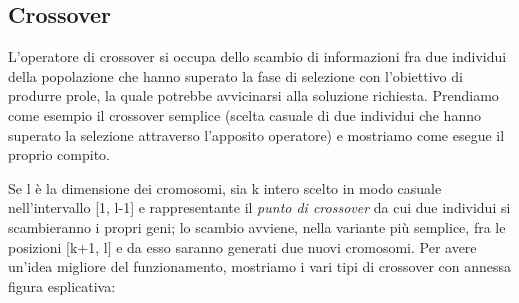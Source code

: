 \subsection{Crossover}
L'operatore di crossover si occupa dello scambio di informazioni fra due individui della popolazione che hanno superato la fase di selezione con l'obiettivo di produrre prole, la quale potrebbe avvicinarsi alla soluzione richiesta. 
Prendiamo come esempio il crossover semplice (scelta casuale di due individui che hanno superato la selezione attraverso l'apposito operatore) e mostriamo come esegue il proprio compito.%
\vspace{3mm}

Se l \`e la dimensione dei cromosomi, sia k intero scelto in modo casuale nell'intervallo [1, l-1] e rappresentante il \textit{punto di crossover} da cui due individui si scambieranno i propri geni; lo scambio avviene, nella variante pi\`u semplice, fra le posizioni [k+1, l] e da esso saranno generati due nuovi cromosomi. Per avere un'idea migliore del funzionamento, mostriamo i vari tipi di crossover con annessa figura esplicativa:
